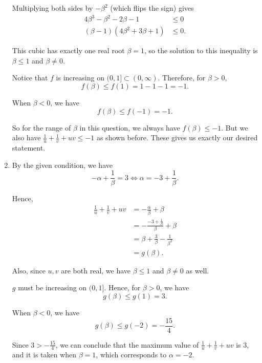 \begin{enumerate}
          Multiplying both sides by \(-\beta^2\) (which flips the sign) gives
          \begin{align*}
              4\beta^3 - \beta^2 - 2\beta - 1    & \leq 0  \\
              (\beta - 1)(4\beta^2 + 3\beta + 1) & \leq 0.
          \end{align*}

          This cubic has exactly one real root \(\beta = 1\), so the solution to this inequality is \(\beta \leq 1\) and \(\beta \neq 0\).

          Notice that \(f\) is increasing on \((0, 1] \subset (0, \infty)\). Therefore, for \(\beta > 0\),
          \[
              f(\beta) \leq f(1) = 1 - 1 - 1 = -1.
          \]

          When \(\beta < 0\), we have
          \[
              f(\beta) \leq f(-1) = -1.
          \]

          So for the range of \(\beta\) in this question, we always have \(f(\beta) \leq -1\). But we also have \(\frac{1}{u} + \frac{1}{v} + uv \leq -1\) as shown before. These gives us exactly our desired statement.

    \item By the given condition, we have
          \[
              -\alpha + \frac{1}{\beta} = 3 \iff \alpha = -3 + \frac{1}{\beta}.
          \]

          Hence,
          \begin{align*}
              \frac{1}{u} + \frac{1}{v} + uv & = - \frac{\alpha}{\beta} + \beta               \\
                                             & = - \frac{-3 + \frac{1}{\beta}}{\beta} + \beta \\
                                             & = \beta + \frac{3}{\beta} - \frac{1}{\beta^2}  \\
                                             & = g(\beta).
          \end{align*}

          Also, since \(u, v\) are both real, we have \(\beta \leq 1\) and \(\beta \neq 0\) as well.

          \(g\) must be increasing on \((0, 1]\). Hence, for \(\beta > 0\), we have
          \[
              g(\beta) \leq g(1) = 3.
          \]

          When \(\beta < 0\), we have
          \[
              g(\beta) \leq g(-2) = -\frac{15}{4}.
          \]

          Since \(3 > -\frac{15}{4}\), we can conclude that the maximum value of \(\frac{1}{u} + \frac{1}{v} + uv\) is \(3\), and it is taken when \(\beta = 1\), which corresponds to \(\alpha = -2\).

\end{enumerate}